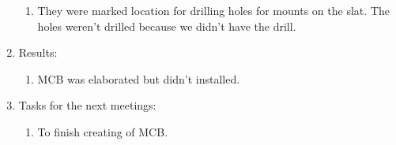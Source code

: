 \begin{enumerate}
\begin{enumerate}
      \item They were marked location for drilling holes for mounts on the slat. The holes weren't drilled because we didn't have the drill.
      
    \end{enumerate}
    
	\item Results: 
	\begin{enumerate}
	  \item MCB was elaborated but didn't installed.
      
    \end{enumerate}
    
	\item Tasks for the next meetings:
	\begin{enumerate}
	  \item To finish creating of MCB.
	  
    \end{enumerate}     
\end{enumerate}
\fillpage
